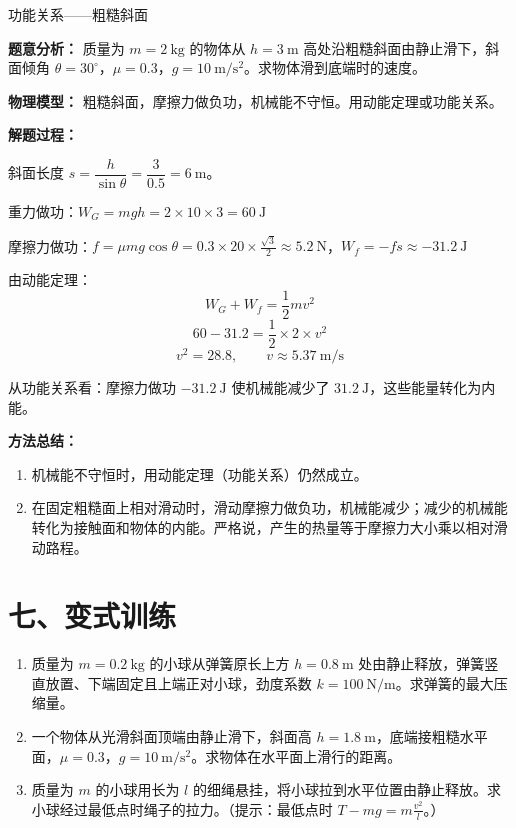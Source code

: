 \begin{examplebox}{功能关系——粗糙斜面}

\textbf{题意分析：} 质量为 $m = 2\ \mathrm{kg}$ 的物体从 $h = 3\ \mathrm{m}$ 高处沿粗糙斜面由静止滑下，斜面倾角 $\theta = 30^\circ$，$\mu = 0.3$，$g = 10\ \mathrm{m/s^2}$。求物体滑到底端时的速度。

\textbf{物理模型：} 粗糙斜面，摩擦力做负功，机械能不守恒。用动能定理或功能关系。

\textbf{解题过程：}

斜面长度 $s = \dfrac{h}{\sin\theta} = \dfrac{3}{0.5} = 6\ \mathrm{m}$。

重力做功：$W_G = mgh = 2 \times 10 \times 3 = 60\ \mathrm{J}$

摩擦力做功：$f = \mu mg\cos\theta = 0.3 \times 20 \times \frac{\sqrt{3}}{2} \approx 5.2\ \mathrm{N}$，$W_f = -f s \approx -31.2\ \mathrm{J}$

由动能定理：
\[
W_G + W_f = \frac12 mv^2
\]
\[
60 - 31.2 = \frac12 \times 2 \times v^2
\]
\[
v^2 = 28.8,\qquad v \approx 5.37\ \mathrm{m/s}
\]

从功能关系看：摩擦力做功 $-31.2\ \mathrm{J}$ 使机械能减少了 $31.2\ \mathrm{J}$，这些能量转化为内能。

\textbf{方法总结：}
\begin{enumerate}
  \item 机械能不守恒时，用动能定理（功能关系）仍然成立。
  \item 在固定粗糙面上相对滑动时，滑动摩擦力做负功，机械能减少；减少的机械能转化为接触面和物体的内能。严格说，产生的热量等于摩擦力大小乘以相对滑动路程。
\end{enumerate}

\end{examplebox}

\section*{七、变式训练}

\begin{enumerate}
  \item 质量为 $m = 0.2\ \mathrm{kg}$ 的小球从弹簧原长上方 $h = 0.8\ \mathrm{m}$ 处由静止释放，弹簧竖直放置、下端固定且上端正对小球，劲度系数 $k = 100\ \mathrm{N/m}$。求弹簧的最大压缩量。

  \item 一个物体从光滑斜面顶端由静止滑下，斜面高 $h = 1.8\ \mathrm{m}$，底端接粗糙水平面，$\mu = 0.3$，$g = 10\ \mathrm{m/s^2}$。求物体在水平面上滑行的距离。
  \begin{center}
  
  \end{center}

  \item 质量为 $m$ 的小球用长为 $l$ 的细绳悬挂，将小球拉到水平位置由静止释放。求小球经过最低点时绳子的拉力。（提示：最低点时 $T - mg = m\frac{v^2}{l}$。）
  \begin{center}
  
  \end{center}
\end{enumerate}

